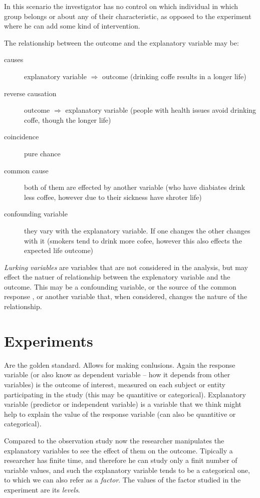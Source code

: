 In this scenario the investigator has no control on which individual in which
group belongs or about any of their characteristic, as opposed to the experiment
where he can add some kind of intervention.

The relationship between the outcome and the explanatory variable may be:

\begin{description}
	\item[causes] explanatory variable $\Rightarrow$ outcome (drinking coffe
	      results in a longer life)
	\item[reverse causation] outcome $\Rightarrow$ explanatory variable (people
	      with health issues avoid drinking coffe, though the longer life)
	\item[coincidence] pure chance
	\item[common cause] both of them are effected by another variable (who have
	      diabiates drink less coffee, however due to their sickness have shroter life)
	\item[confounding variable] they vary with the explanatory variable. If one
	      changes the other changes with it (smokers tend to drink more cofee, however
	      this also effects the expected life outcome)
\end{description}

\emph{Lurking variables} are variables that are not considered in the analysis,
but may effect the natuer of relationship between the explenatory variable and
the outcome. This may be a confounding variable, or the source of the common
response , or another variable that, when considered, changes the nature of the
relationship.

\section{Experiments}

Are the golden standard. Allows for making conlusions. Again the response
variable (or also know as dependent variable -- how it depends from other
variables) is the outcome of interest, measured on each subject or entity
participating in the study (this may be quantitive or categorical). Explanatory
variable (predictor or independent variable) is a variable that we think might
help to explain the value of the response variable (can also be quantitive or
categorical).

Compared to the observation study now the researcher manipulates the explanatory
variables to see the effect of them on the outcome. Tipically a researcher has
finite time, and therefore he can study only a finit number of variable values,
and such the explanatory variable tends to be a categorical one, to which we can
also refer as a \emph{factor}. The values of the factor studied in the
experiment are its \emph{levels}.

